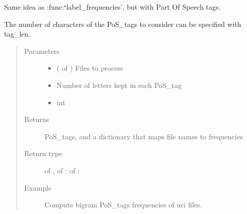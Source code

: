 \documentclass[letterpaper,10pt,english]{sphinxmanual}
\begin{document}
\begin{fulllineitems}
\label{\detokenize{analysis:loacore.analysis.frequencies.bigram_pos_tag_frequencies}}
Same idea as :func:{\color{red}\bfseries{}{}`}label\_frequencies’, but with Part Of Speech tags.

The number of characters of the PoS\_tags to consider can be specified with tag\_len.
\begin{quote}\begin{description}
\item[{Parameters}] \leavevmode\begin{itemize}
\item {} 
 ( of {\hyperref[\detokenize{classes:loacore.classes.classes.File}]{}}) \textendash{} Files to process

\item {} 
 \textendash{} Number of letters kept in each PoS\_tag

\item {} 
 \textendash{} int

\end{itemize}

\item[{Returns}] \leavevmode
PoS\_tags, and a dictionary that maps file names to frequencies

\item[{Return type}] \leavevmode
{} of  ,  of  :  of  : 

\item[{Example}] \leavevmode
Compute bigram PoS\_tags frequencies of uci files.

\end{description}\end{quote}

\end{fulllineitems}

\end{document}
